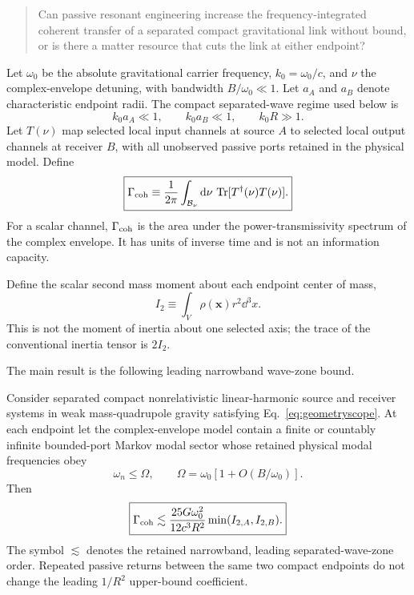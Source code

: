 \begin{quote}
Can passive resonant engineering increase the frequency-integrated coherent transfer of a separated compact gravitational link without bound, or is there a matter resource that cuts the link at either endpoint?
\end{quote}

Let $\omega_0$ be the absolute gravitational carrier frequency, $k_0=\omega_0/c$, and $\nu$ the complex-envelope detuning, with bandwidth $B/\omega_0\ll1$. Let $a_A$ and $a_B$ denote characteristic endpoint radii. The compact separated-wave regime used below is
\begin{equation}
k_0a_A\ll1,\qquad k_0a_B\ll1,\qquad k_0R\gg1.
\label{eq:geometryscope}
\end{equation}
Let $T(\nu)$ map selected local input channels at source $A$ to selected local output channels at receiver $B$, with all unobserved passive ports retained in the physical model. Define
\begin{equation}
\boxed{
\Gamma_{\rm coh}
\equiv
\frac{1}{2\pi}
\int_{\mathcal B_\nu}\mathrm d\nu\,
\operatorname{Tr}[T^\dagger(\nu)T(\nu)] .
}
\label{eq:gamma}
\end{equation}
For a scalar channel, $\Gamma_{\rm coh}$ is the area under the power-transmissivity spectrum of the complex envelope. It has units of inverse time and is not an information capacity.

Define the scalar second mass moment about each endpoint center of mass,
\begin{equation}
I_2\equiv\int_V\rho(\bm x)r^2\dd^3x .
\label{eq:I2}
\end{equation}
This is not the moment of inertia about one selected axis; the trace of the conventional inertia tensor is $2I_2$.

The main result is the following leading narrowband wave-zone bound.

\begin{theorem}
Consider separated compact nonrelativistic linear-harmonic source and receiver systems in weak mass-quadrupole gravity satisfying Eq.~\eqref{eq:geometryscope}. At each endpoint let the complex-envelope model contain a finite or countably infinite bounded-port Markov modal sector whose retained physical modal frequencies obey
\begin{equation}
\omega_n\le\Omega,
\qquad
\Omega=\omega_0[1+O(B/\omega_0)].
\label{eq:retainedsector}
\end{equation}
Then
\begin{equation}
\boxed{
\Gamma_{\rm coh}
\lesssim
\frac{25G\omega_0^2}{12c^3R^2}
\min(I_{2,A},I_{2,B}) .
}
\label{eq:headline}
\end{equation}
The symbol $\lesssim$ denotes the retained narrowband, leading separated-wave-zone order. Repeated passive returns between the same two compact endpoints do not change the leading $1/R^2$ upper-bound coefficient.
\end{theorem}

